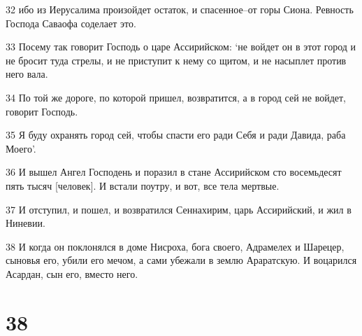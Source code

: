 \par 32 ибо из Иерусалима произойдет остаток, и спасенное--от горы Сиона. Ревность Господа Саваофа соделает это.
\par 33 Посему так говорит Господь о царе Ассирийском: `не войдет он в этот город и не бросит туда стрелы, и не приступит к нему со щитом, и не насыплет против него вала.
\par 34 По той же дороге, по которой пришел, возвратится, а в город сей не войдет, говорит Господь.
\par 35 Я буду охранять город сей, чтобы спасти его ради Себя и ради Давида, раба Моего'.
\par 36 И вышел Ангел Господень и поразил в стане Ассирийском сто восемьдесят пять тысяч [человек]. И встали поутру, и вот, все тела мертвые.
\par 37 И отступил, и пошел, и возвратился Сеннахирим, царь Ассирийский, и жил в Ниневии.
\par 38 И когда он поклонялся в доме Нисроха, бога своего, Адрамелех и Шарецер, сыновья его, убили его мечом, а сами убежали в землю Араратскую. И воцарился Асардан, сын его, вместо него.

\chapter{38}

